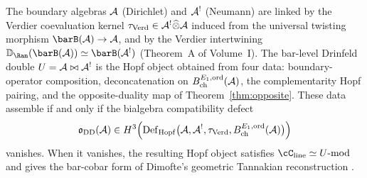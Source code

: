 \begin{remark}
\label{rem:drinfeld-double-programme}
The boundary algebras $\mathcal{A}$ (Dirichlet) and $\mathcal{A}^!$ (Neumann) are
linked by the Verdier coevaluation kernel
$\tau_{\mathrm{Verd}}\in \mathcal{A}^! \widehat\otimes \mathcal{A}$ induced from the
universal twisting morphism $\barB(\cA)\to\cA$, and by the Verdier
intertwining
$\mathbb{D}_{\Ran}(\barB(\cA)) \simeq \barB(\cA^!)$ (Theorem~A of
Volume~I). The bar-level Drinfeld double
$U=\mathcal{A}\bowtie\mathcal{A}^!$ is the Hopf object obtained from four data:
boundary-operator composition, deconcatenation on
$B^{E_1,\mathrm{ord}}_{\mathrm{ch}}(\mathcal{A})$, the complementarity Hopf
pairing, and the opposite-duality map of Theorem~\ref{thm:opposite}.
These data assemble if and only if the bialgebra compatibility defect
\[
 \mathfrak{o}_{\mathrm{DD}}(\mathcal{A})
 \in
 H^3\!\left(
   \operatorname{Def}_{\mathrm{Hopf}}\bigl(\mathcal{A},\mathcal{A}^!,\tau_{\mathrm{Verd}},
   B^{E_1,\mathrm{ord}}_{\mathrm{ch}}(\mathcal{A})\bigr)
 \right)
\]
vanishes. When it vanishes, the resulting Hopf object satisfies
$\cC_{\mathrm{line}}\simeq U\text{-mod}$ and gives the bar-cobar form
of Dimofte's geometric Tannakian reconstruction \cite{Dimofte25}.
\end{remark}


